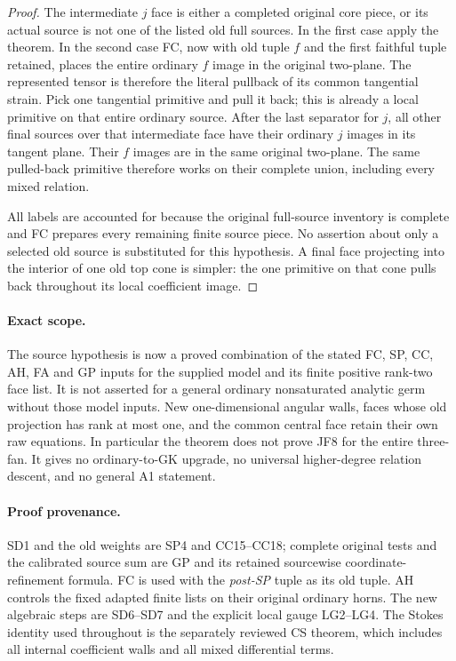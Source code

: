 \begin{proof}
The intermediate $j$ face is either a completed original core
piece, or its actual source is not one of the listed old full
sources.  In the first case apply the theorem.  In the second
case FC, now with old tuple $f$ and the first faithful tuple
retained, places the entire ordinary $f$ image in the original
two-plane.  The represented tensor is therefore the literal
pullback of its common tangential strain.  Pick one tangential
primitive and pull it back; this is already a local primitive
on that entire ordinary source.  After the last separator for
$j$, all other final sources over that intermediate face have
their ordinary $j$ images in its tangent plane.  Their $f$
images are in the same original two-plane.  The same pulled-back
primitive therefore works on their complete union, including
every mixed relation.

All labels are accounted for because the original full-source
inventory is complete and FC prepares every remaining finite
source piece.  No assertion about only a selected old source is
substituted for this hypothesis.  A final face projecting into
the interior of one old top cone is simpler: the one primitive
on that cone pulls back throughout its local coefficient image.
\end{proof}

\paragraph{Exact scope.}
The source hypothesis is now a proved combination of the stated
FC, SP, CC, AH, FA and GP inputs for the supplied model and its
finite positive rank-two face list.  It is not asserted for a
general ordinary nonsaturated analytic germ without those model
inputs.  New one-dimensional angular walls, faces whose old
projection has rank at most one, and the common central face
retain their own raw equations.  In particular the theorem
does not prove JF8 for the entire three-fan.  It gives no
ordinary-to-GK upgrade, no universal higher-degree relation
descent, and no general A1 statement.

\paragraph{Proof provenance.}
SD1 and the old weights are SP4 and CC15--CC18; complete original
tests and the calibrated source sum are GP and its retained
sourcewise coordinate-refinement formula.  FC is used with the
\emph{post-SP} tuple as its old tuple.  AH controls the fixed
adapted finite lists on their original ordinary horns.  The
new algebraic steps are SD6--SD7 and the explicit local gauge
LG2--LG4.  The Stokes identity used throughout is the separately
reviewed CS theorem, which includes all internal coefficient
walls and all mixed differential terms.
